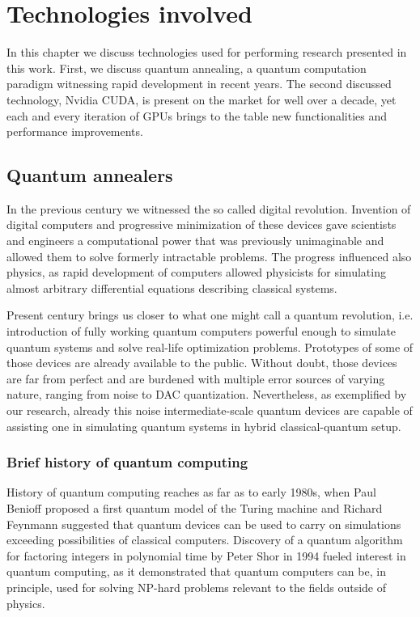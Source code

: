 \chapter{Technologies involved}
\label{chapter:near-term}

 In this chapter we discuss technologies used for performing research presented in this work.
 First, we discuss quantum annealing, a quantum computation paradigm witnessing rapid development in recent years. The second discussed technology, Nvidia CUDA, is present on the market for well over a decade, yet each and every iteration of GPUs brings to the table new functionalities and performance improvements. 

\section{Quantum annealers}
In the previous century we witnessed the so called digital revolution. Invention of digital computers and progressive minimization of these devices gave scientists and engineers a computational power that was previously unimaginable and allowed them to solve formerly intractable problems. The progress influenced also physics, as rapid development of computers allowed physicists for simulating almost arbitrary differential equations describing classical systems.

Present century brings us closer to what one might call a quantum revolution, i.e. introduction of fully working quantum computers powerful enough to simulate quantum systems and solve real-life optimization problems. Prototypes of some of those devices are already available to the public. Without doubt, those devices are far from perfect and are burdened with multiple error sources of varying nature, ranging from noise to DAC quantization.  Nevertheless, as exemplified by our research, already this noise intermediate-scale quantum devices are capable of assisting one in simulating quantum systems in hybrid classical-quantum setup. 
\subsection{Brief history of quantum computing}
History of quantum computing reaches as far as to early 1980s, when Paul Benioff proposed a first quantum model of the Turing machine and Richard Feynmann suggested that quantum devices can be used to carry on simulations exceeding possibilities of classical computers.  Discovery of a quantum algorithm for factoring integers in polynomial time by Peter Shor in 1994 fueled interest in quantum computing, as it demonstrated that quantum computers can be, in principle, used for solving NP-hard problems relevant to the fields outside of physics.

